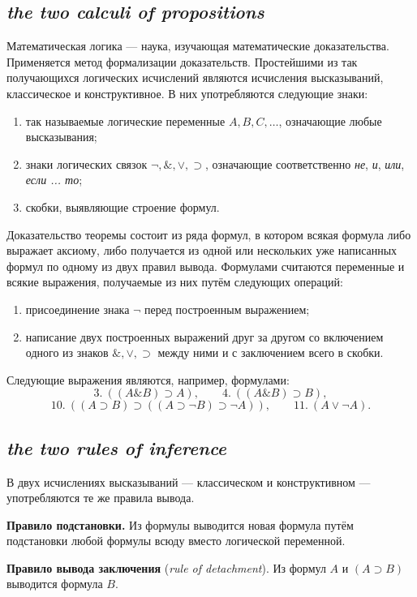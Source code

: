 \subsection*{ \textit{the two calculi of propositions}}
\begin{rusblock}
Математическая логика --- наука, изучающая математические доказательства. Применяется метод формализации доказательств. Простейшими из так получающихся логических исчислений являются исчисления высказываний, классическое и конструктивное. В них употребляются следующие знаки:
\begin{enumerate}[leftmargin=2.2em]
\item так называемые логические переменные $A,B,C,\ldots$, означающие любые высказывания;
\item знаки логических связок $\neg,\&,\vee,\supset$, означающие соответственно \emph{не}, \emph{и}, \emph{или}, \emph{если ... то};
\item скобки, выявляющие строение формул.
\end{enumerate}

Доказательство теоремы состоит из ряда формул, в котором всякая формула либо выражает аксиому, либо получается из одной или нескольких уже написанных формул по одному из двух правил вывода. Формулами считаются переменные и всякие выражения, получаемые из них путём следующих операций:
\begin{enumerate}[leftmargin=2.2em]
\item присоединение знака $\neg$ перед построенным выражением;
\item написание двух построенных выражений друг за другом со включением одного из знаков $\&,\vee,\supset$ между ними и с заключением всего в скобки.
\end{enumerate}
Следующие выражения являются, например, формулами:
\[
3.\ ((A\&B)\supset A),\qquad
4.\ ((A\&B)\supset B),
\]
\[
10.\ ((A\supset B)\supset((A\supset\neg B)\supset\neg A)),
\qquad
11.\ (A\vee\neg A).
\]
\end{rusblock}

\subsection*{ \textit{the two rules of inference}}
\begin{rusblock}
В двух исчислениях высказываний --- классическом и конструктивном --- употребляются те же правила вывода.

\textbf{Правило подстановки.} Из формулы выводится новая формула путём подстановки любой формулы всюду вместо логической переменной.

\textbf{Правило вывода заключения} (\textit{rule of detachment}). Из формул $A$ и $(A\supset B)$ выводится формула $B$.
\end{rusblock}

